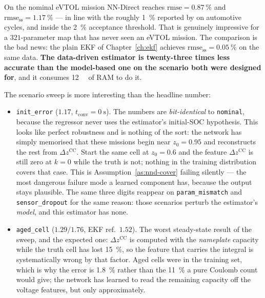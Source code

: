 On the nominal eVTOL mission NN-Direct reaches $\mathrm{rmse} = \SI{0.87}{\percent}$ and
$\mathrm{rmse_{ss}} = \SI{1.17}{\percent}$ --- in line with the roughly \SI{1}{\percent} reported
by \citet{chemali2018dnn} on automotive cycles, and inside the \SI{2}{\percent} acceptance
threshold.  That is genuinely impressive for a $\num{321}$-parameter map that has never seen an
eVTOL mission.  The comparison is the bad news: the plain EKF of Chapter~\ref{ch:ekf} achieves
$\mathrm{rmse_{ss}} = \SI{0.05}{\percent}$ on the same data.  \textbf{The data-driven estimator is
twenty-three times less accurate than the model-based one on the scenario both were designed
for}, and it consumes \SI{12}{\kilo\byte} of RAM to do it.

The scenario sweep is more interesting than the headline number:
\begin{itemize}
  \item \texttt{init\_error} ($1.17$, $t_\text{conv} = \SI{0}{\second}$).  The numbers are
        \emph{bit-identical} to \texttt{nominal}, because the regressor never uses the estimator's
        initial-SOC hypothesis.  This looks like perfect robustness and is nothing of the sort: the
        network has simply memorised that these missions begin near $z_0 = 0.95$ and reconstructs
        the rest from $\Delta z^{\mathrm{CC}}$.  Start the same cell at $z_0 = 0.6$ and the feature
        $\Delta z^{\mathrm{CC}}$ is still zero at $k=0$ while the truth is not; nothing in the
        training distribution covers that case.  This is Assumption~\ref{as:nnd-cover} failing
        silently --- the most dangerous failure mode a learned component has, because the output
        stays plausible.  The same three digits reappear on \texttt{param\_mismatch} and
        \texttt{sensor\_dropout} for the same reason: those scenarios perturb the estimator's
        \emph{model}, and this estimator has none.
  \item \texttt{aged\_cell} ($1.29/1.76$, EKF ref.\ $1.52$).  The worst steady-state result of the
        sweep, and the expected one: $\Delta z^{\mathrm{CC}}$ is computed with the \emph{nameplate}
        capacity while the truth cell has lost \SI{15}{\percent}, so the feature that carries the
        integral is systematically wrong by that factor.  Aged cells were in the training set,
        which is why the error is \SI{1.8}{\percent} rather than the \SI{11}{\percent} a pure
        Coulomb count would give; the network has learned to read the remaining capacity off the
        voltage features, but only approximately.

\end{itemize}
